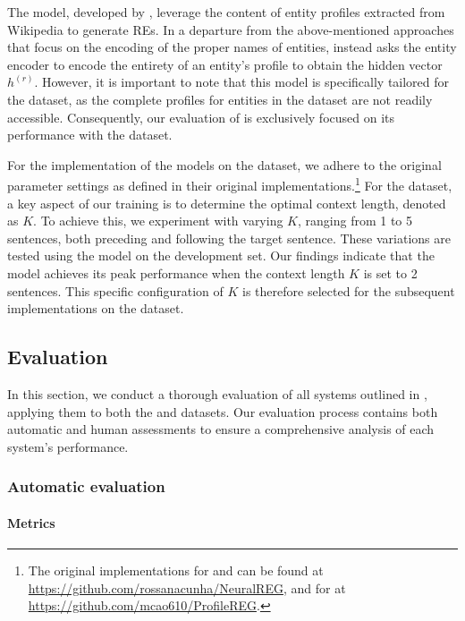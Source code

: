 The  model, developed by \citet{cao2019referring}, leverage the content of entity profiles extracted from Wikipedia to generate REs. In a departure from the above-mentioned approaches that focus on the encoding of the proper names of entities,  instead asks the entity encoder to encode the entirety of an entity's profile to obtain the hidden vector $h^{(r)}$. However, it is important to note that this model is specifically tailored for the \webnlg dataset, as the complete profiles for entities in the \wsj dataset are not readily accessible. Consequently, our evaluation of  is exclusively focused on its performance with the \webnlg dataset.

For the implementation of the models on the \webnlg dataset, we adhere to the original parameter settings as defined in their original implementations.\footnote{The original implementations for  and  can be found at \url{https://github.com/rossanacunha/NeuralREG}, and for  at \url{https://github.com/mcao610/ProfileREG}.} For the \wsj dataset, a key aspect of our training is to determine the optimal context length, denoted as $K$. To achieve this, we experiment with varying $K$, ranging from 1 to 5 sentences, both preceding and following the target sentence. These variations are tested using the  model on the \wsj development set. Our findings indicate that the model achieves its peak performance when the context length $K$ is set to 2 sentences. This specific configuration of $K$ is therefore selected for the subsequent implementations on the \wsj dataset.


\subsection{Evaluation}\label{sec:evaluation}

In this section, we conduct a thorough evaluation of all systems outlined in , applying them to both the \webnlg and \wsj datasets. Our evaluation process contains both automatic and human assessments to ensure a comprehensive analysis of each system's performance. 

\subsubsection{Automatic evaluation}

\paragraph*{Metrics} 

